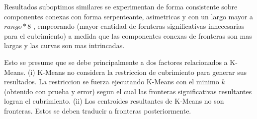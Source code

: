 Resultados suboptimos similares se experimentan de forma consistente %
sobre componentes conexas con forma serpenteante,
  asimetricas y con un largo mayor a $rango*8$ 
, empeorando (mayor cantidad de fornteras significativas
innecesarias para el cubrimiento) a medida que las componentes conexas de
fronteras son mas largas y las curvas son mas intrincadas.




Esto se presume que se debe principalmente a dos factores relacionados a
K-Means. (i) K-Means no considera la restriccion de cubrimiento para generar sus
resultados. La restriccion se fuerza ejecutando K-Means con el minimo $k$
(obtenido con prueba y error) segun el cual las fronteras significativas
resultantes logran el cubrimiento. (ii) Los centroides resultantes de K-Means
no son fronteras. Estos se deben traducir a fronteras posteriormente.




